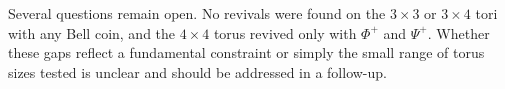 Several questions remain open. No revivals were found on the
$3 \times 3$ or $3 \times 4$ tori with any Bell coin, and the
$4 \times 4$ torus revived only with $\Phi^+$ and $\Psi^+$. Whether
these gaps reflect a fundamental constraint or simply the small range
of torus sizes tested is unclear and should be addressed in a follow-up.

